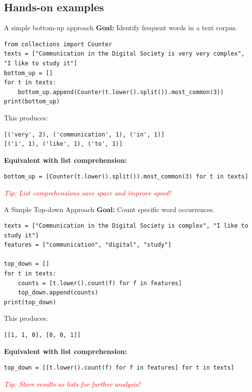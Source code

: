 \documentclass[handout]{beamer}
\begin{document}
\subsection{Hands-on examples}

\begin{frame}[fragile]{A simple bottom-up approach}
\textbf{Goal:} Identify frequent words in a text corpus.

\begin{verbatim}
from collections import Counter
texts = ["Communication in the Digital Society is very very complex", "I like to study it"]
bottom_up = []
for t in texts:
    bottom_up.append(Counter(t.lower().split()).most_common(3))
print(bottom_up)
\end{verbatim}

\pause

This produces:

\begin{verbatim}
[('very', 2), ('communication', 1), ('in', 1)]
[('i', 1), ('like', 1), ('to', 1)]
\end{verbatim}

\pause
\textbf{Equivalent with list comprehension:}

\begin{verbatim}
bottom_up = [Counter(t.lower().split()).most_common(3) for t in texts]
\end{verbatim}

\vspace{0.2cm}
\textcolor{red}{\footnotesize{\emph{Tip: List comprehensions save space and improve speed!}}}
\end{frame}

\begin{frame}[fragile]{A Simple Top-down Approach}
\textbf{Goal:} Count specific word occurrences.

\begin{verbatim}
texts = ["Communication in the Digital Society is complex", "I like to study it"]
features = ["communication", "digital", "study"]

top_down = []
for t in texts:
    counts = [t.lower().count(f) for f in features]
    top_down.append(counts)
print(top_down)
\end{verbatim}

\pause
This produces:

\begin{verbatim}
[[1, 1, 0], [0, 0, 1]]
\end{verbatim}

\pause
\textbf{Equivalent with list comprehension:}

\begin{verbatim}
top_down = [[t.lower().count(f) for f in features] for t in texts]
\end{verbatim}

\vspace{0.2cm}
\textcolor{red}{\footnotesize{\emph{Tip: Store results as lists for further analysis!}}}
\end{frame}
\end{document}
